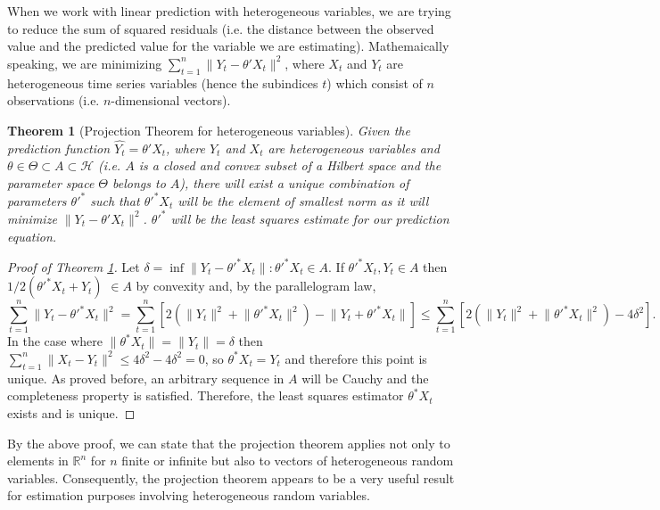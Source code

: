 \documentclass{article}
\newtheorem{thm}{Theorem}
\begin{document}
When we work with linear prediction with heterogeneous variables, we are trying to reduce the sum of squared residuals (i.e. the distance between the observed value and the predicted value for the variable we are estimating). Mathemaically speaking, we are minimizing $\sum_{t=1}^n\lVert Y_t - \theta'X_t \rVert ^2$, where $X_t$ and $Y_t$ are heterogeneous time series variables (hence the subindices $t$) which consist of $n$ observations (i.e. $n$-dimensional vectors). \newline

\begin{thm}[Projection Theorem for heterogeneous variables] \label{thm:htv}
Given the prediction function $\hat{Y_t} = \theta' X_t$, where $Y_t$ and $X_t$ are heterogeneous variables and $\theta \in \Theta \subset A \subset \mathscr{H}$ (i.e. $A$ is a closed and convex subset of a Hilbert space and the parameter space $\Theta$ belongs to $A$), there will exist a unique combination of parameters $\theta'^*$ such that $\theta'^* X_t$ will be the element of smallest norm as it will minimize $\lVert Y_t - \theta' X_t \rVert^2$. $\theta'^*$ will be the least squares estimate for our prediction equation.
\end{thm}

\begin{proof}[Proof of Theorem \ref{thm:htv}]
Let $\delta = \inf {\lVert Y_t - \theta'^* X_t \rVert : \theta'^* X_t \in A}$. If $\theta'^* X_t, Y_t \in A$ then $1/2$$(\theta'^* X_t + Y_t)$ $\in A$ by convexity and, by the parallelogram law, 
\[
\sum_{t=1}^n\lVert Y_t - \theta'^* X_t \rVert^2 = \sum_{t=1}^n [2( \lVert Y_t \rVert^2 + \lVert \theta'^* X_t \rVert^2) - \lVert Y_t +\theta'^* X_t \rVert] \leqslant \sum_{t=1}^n [2(\lVert Y_t \rVert^2 + \lVert \theta'^* X_t \rVert^2) - 4\delta^2].
\]
In the case where $\lVert \theta^* X_t \rVert = \lVert Y_t \rVert = \delta$ then $\sum_{t=1}^n \lVert X_t - Y_t \rVert^2 \leqslant 4\delta^2 - 4\delta^2 = 0$, so $\theta^* X_t = Y_t$ and therefore this point is unique. 
As proved before, an arbitrary sequence in $A$ will be Cauchy and the completeness property is satisfied. Therefore, the least squares estimator $\theta^* X_t$ exists and is unique.
\end{proof}

By the above proof, we can state that the projection theorem applies not only to elements in $\mathbb R^n$ for $n$ finite or infinite but also to vectors of heterogeneous random variables. Consequently, the projection theorem appears to be a very useful result for estimation purposes involving heterogeneous random variables. \newline
\end{document}
